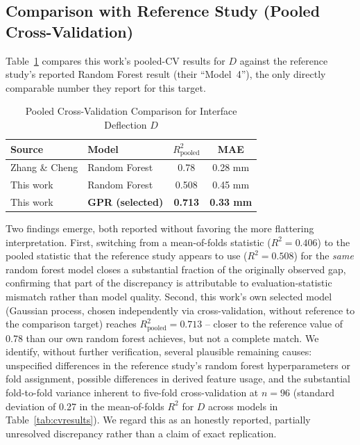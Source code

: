 \documentclass[conference]{IEEEtran}
\begin{document}
\subsection{Comparison with Reference Study (Pooled Cross-Validation)}
Table~\ref{tab:comparison} compares this work's pooled-CV results for $D$ against the reference study's reported Random Forest result (their ``Model~4''), the only directly comparable number they report for this target.

\begin{table}[!t]
\caption{Pooled Cross-Validation Comparison for Interface Deflection $D$}
\label{tab:comparison}
\centering
\footnotesize
\setlength{\tabcolsep}{3pt}
\begin{tabular}{@{}llcc@{}}
\toprule
\textbf{Source} & \textbf{Model} & $R^2_{\text{pooled}}$ & \textbf{MAE} \\
\midrule
Zhang \& Cheng \cite{zhang_cheng2022} & Random Forest & 0.78 & 0.28 mm \\
This work & Random Forest & 0.508 & 0.45 mm \\
This work & \textbf{GPR (selected)} & \textbf{0.713} & \textbf{0.33 mm} \\
\bottomrule
\end{tabular}
\end{table}

Two findings emerge, both reported without favoring the more flattering interpretation. First, switching from a mean-of-folds statistic ($R^2=0.406$) to the pooled statistic that the reference study appears to use ($R^2=0.508$) for the \emph{same} random forest model closes a substantial fraction of the originally observed gap, confirming that part of the discrepancy is attributable to evaluation-statistic mismatch rather than model quality. Second, this work's own selected model (Gaussian process, chosen independently via cross-validation, without reference to the comparison target) reaches $R^2_{\text{pooled}}=0.713$ -- closer to the reference value of 0.78 than our own random forest achieves, but not a complete match. We identify, without further verification, several plausible remaining causes: unspecified differences in the reference study's random forest hyperparameters or fold assignment, possible differences in derived feature usage, and the substantial fold-to-fold variance inherent to five-fold cross-validation at $n=96$ (standard deviation of 0.27 in the mean-of-folds $R^2$ for $D$ across models in Table~\ref{tab:cvresults}). We regard this as an honestly reported, partially unresolved discrepancy rather than a claim of exact replication.
\end{document}
